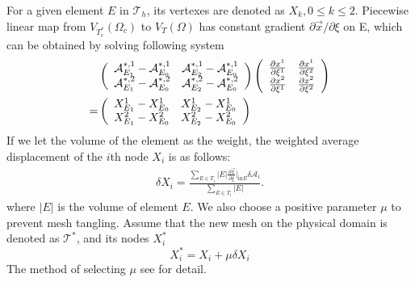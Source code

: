 \documentclass[a4paper, 11pt]{article}
\begin{document}
      For a given element $E$ in $\mathcal{T}_h$, its vertexes are
      denoted as $X_k, 0 \leq k \leq 2$. Piecewise linear map from
      $V_{T_c^*}(\Omega_c)$ to $V_T(\Omega)$ has constant gradient 
      $\partial \vec{x} / \partial \xi $ on E, which can be obtained by 
      solving following system
      \begin{eqnarray}
        \begin{aligned}
          & \left (
            \begin{array}{cc}
              \mathcal{A}_{E_1}^{*, 1} - \mathcal{A}_{E_0}^{*, 1} & 
              \mathcal{A}_{E_2}^{*, 1} - \mathcal{A}_{E_0}^{*, 1} \\
              \mathcal{A}_{E_1}^{*, 2} - \mathcal{A}_{E_0}^{*, 2} &
              \mathcal{A}_{E_2}^{*, 2} - \mathcal{A}_{E_0}^{*, 2} 
            \end{array} 
          \right )
          \left (
            \begin{array}{cc}
              \frac{\partial x^1}{\partial \xi^1} & \frac{\partial
                x^1}{\partial \xi^2} \\
              \frac{\partial x^2}{\partial
                \xi^1} & \frac{\partial x^2}{\partial \xi^2}
            \end{array}
          \right ) \notag \\ = & 
          \left (
            \begin{array}{ll}
              X_{E_1}^1 - X_{E_0}^1 & X_{E_2}^1 - X_{E_0}^1 \\
              X_{E_1}^2 - X_{E_0}^2 & X_{E_2}^2 - X_{E_0}^2 
            \end{array}
          \right )
        \end{aligned}
      \end{eqnarray}
      If we let the volume of the element as the weight, the weighted 
      average displacement of the $i$th node $X_i$ is as follows:
      \begin{eqnarray}
        \delta X_i = \frac{\sum\limits_{E \in T_i} |E| \frac{\partial
            \vec{x}}{\partial \xi}|_{\text{in} E} \delta
          \mathcal{A}_i}{\sum\limits_{E \in T_i} |E|}.
      \end{eqnarray}
      where $|E|$ is the volume of element $E$.
      We also choose a positive parameter $\mu$ to prevent mesh
      tangling. Assume that the new mesh on the physical domain is
      denoted as $\mathcal{T}^*$, and its nodes $X_i^*$
      \begin{equation}
        X_i^* = X_i + \mu \delta X_i
      \end{equation}
      The method of selecting $\mu$ see \cite{di2005moving} for detail. 
\end{document}
